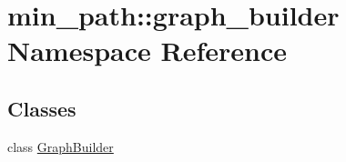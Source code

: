 \hypertarget{a00036}{}\section{min\+\_\+path\+:\+:graph\+\_\+builder Namespace Reference}
\label{a00036}
\subsection*{Classes}
\begin{DoxyCompactItemize}
\item 
class \hyperlink{a00007}{Graph\+Builder}
\end{DoxyCompactItemize}
